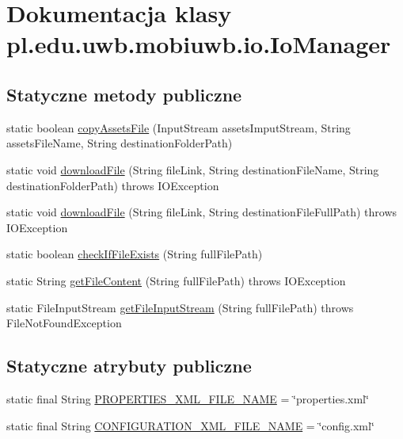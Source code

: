 \hypertarget{classpl_1_1edu_1_1uwb_1_1mobiuwb_1_1io_1_1_io_manager}{}\section{Dokumentacja klasy pl.\+edu.\+uwb.\+mobiuwb.\+io.\+Io\+Manager}
\label{classpl_1_1edu_1_1uwb_1_1mobiuwb_1_1io_1_1_io_manager}
\subsection*{Statyczne metody publiczne}
\begin{DoxyCompactItemize}
\item 
static boolean \hyperlink{classpl_1_1edu_1_1uwb_1_1mobiuwb_1_1io_1_1_io_manager_ab3e38ae5e5bd2bec785f1a166d4cadd4}{copy\+Assets\+File} (Input\+Stream assets\+Imput\+Stream, String assets\+File\+Name, String destination\+Folder\+Path)
\item 
static void \hyperlink{classpl_1_1edu_1_1uwb_1_1mobiuwb_1_1io_1_1_io_manager_a99eedf375c68628eff07bab00215c54b}{download\+File} (String file\+Link, String destination\+File\+Name, String destination\+Folder\+Path)  throws I\+O\+Exception     
\item 
static void \hyperlink{classpl_1_1edu_1_1uwb_1_1mobiuwb_1_1io_1_1_io_manager_ab407aa924de6f515b83cb07464bb64f5}{download\+File} (String file\+Link, String destination\+File\+Full\+Path)  throws I\+O\+Exception     
\item 
static boolean \hyperlink{classpl_1_1edu_1_1uwb_1_1mobiuwb_1_1io_1_1_io_manager_aee8ba74598e072cdfb1ae4473a3f71b5}{check\+If\+File\+Exists} (String full\+File\+Path)
\item 
static String \hyperlink{classpl_1_1edu_1_1uwb_1_1mobiuwb_1_1io_1_1_io_manager_aced8bbba4256ff397170eaa6ed4092e7}{get\+File\+Content} (String full\+File\+Path)  throws I\+O\+Exception     
\item 
static File\+Input\+Stream \hyperlink{classpl_1_1edu_1_1uwb_1_1mobiuwb_1_1io_1_1_io_manager_a290a552e48bbd1a949566c376148bfcb}{get\+File\+Input\+Stream} (String full\+File\+Path)  throws File\+Not\+Found\+Exception     
\end{DoxyCompactItemize}
\subsection*{Statyczne atrybuty publiczne}
\begin{DoxyCompactItemize}
\item 
static final String \hyperlink{classpl_1_1edu_1_1uwb_1_1mobiuwb_1_1io_1_1_io_manager_afe85a73ba16f0c4c6dcaa0f92278e567}{P\+R\+O\+P\+E\+R\+T\+I\+E\+S\+\_\+\+X\+M\+L\+\_\+\+F\+I\+L\+E\+\_\+\+N\+A\+M\+E} = \char`\"{}properties.\+xml\char`\"{}
\item 
static final String \hyperlink{classpl_1_1edu_1_1uwb_1_1mobiuwb_1_1io_1_1_io_manager_a63ac59bc913302350eee7f52e99d087d}{C\+O\+N\+F\+I\+G\+U\+R\+A\+T\+I\+O\+N\+\_\+\+X\+M\+L\+\_\+\+F\+I\+L\+E\+\_\+\+N\+A\+M\+E} = \char`\"{}config.\+xml\char`\"{}
\end{DoxyCompactItemize}


